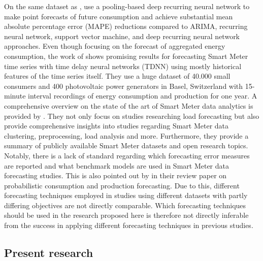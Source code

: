 On the same dataset as \citet{Arora:2016}, \citet{Shi:2017} use a pooling-based deep recurring neural network to make point forecasts of future consumption and achieve substantial mean absolute percentage error (MAPE) reductions compared to ARIMA, recurring neural network, support vector machine, and deep recurring neural network approaches.
Even though focusing on the forecast of aggregated energy consumption, the work of \citet{Zufferey:2017} shows promising results for forecasting Smart Meter time series with time delay neural networks (TDNN) using mostly historical features of the time series itself. They use a huge dataset of 40.000 small consumers and 400 photovoltaic power generators in Basel, Switzerland with 15-minute interval recordings of energy consumption and production for one year.
A comprehensive overview on the state of the art of Smart Meter data analytics is provided by \citet{Wang:2018}. They not only focus on studies researching load forecasting but also provide comprehensive insights into studies regarding Smart Meter data clustering, preprocessing, load analysis and more. Furthermore, they provide a summary of publicly available Smart Meter datasets and open research topics.
Notably, there is a lack of standard regarding which forecasting error measures are reported and what benchmark models are used in Smart Meter data forecasting studies. This is also pointed out by \citet{Meer:2018} in their review paper on probabilistic consumption and production forecasting. Due to this, different forecasting techniques employed in studies using different datasets with partly differing objectives are not directly comparable. Which forecasting techniques should be used in the research proposed here is therefore not directly inferable from the success in applying different forecasting techniques in previous studies.



\subsection{Present research}\label{Sec:Intro;Subsec:Present}



